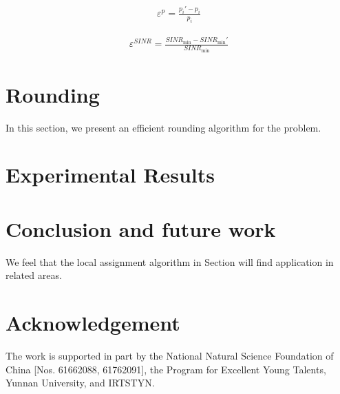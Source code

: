 \documentclass[11pt,a4paper]{article}
\begin{document}
\begin{eqnarray}
	{\varepsilon ^p} = \frac{{{p_i}' - {p_i}}}{{{p_i}}}
\end{eqnarray}


\begin{eqnarray}
	{\varepsilon ^{SINR}} = \frac{{SIN{R_{\min }} - SIN{R_{\min }}'}}{{SIN{R_{\min }}}}
\end{eqnarray}



\section{Rounding}
In this section, we present an efficient rounding algorithm for the problem.

\section{Experimental Results}

\section{Conclusion and future work}
We feel that the local assignment algorithm in Section will find
application in related areas.




\section*{Acknowledgement}
The work is
supported in part by the National Natural Science Foundation of
China [Nos. 61662088, 61762091], the Program
for Excellent Young Talents, Yunnan University, and IRTSTYN.

\begin{thebibliography}{}




\end{thebibliography}
\end{document}
